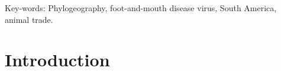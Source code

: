 \documentclass[10pt]{article}
\begin{document}
Key-words: Phylogeography, foot-and-mouth disease virus, South America, animal trade.


\section*{Introduction}
\end{document}
